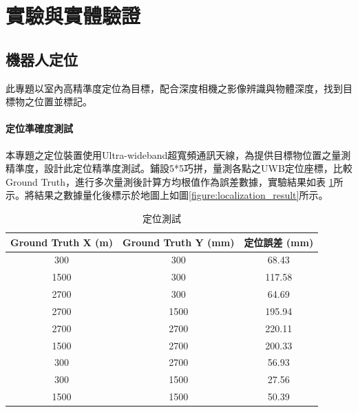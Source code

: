 \section{實驗與實體驗證}

\subsection{機器人定位}

此專題以室內高精準度定位為目標，配合深度相機之影像辨識與物體深度，找到目標物之位置並標記。

\paragraph{定位準確度測試}

本專題之定位裝置使用Ultra-wideband超寬頻通訊天線，為提供目標物位置之量測精準度，設計此定位精準度測試。鋪設5*5巧拼，量測各點之UWB定位座標，比較Ground Truth，進行多次量測後計算方均根值作為誤差數據，實驗結果如表
\ref{table:localization_error}所示。將結果之數據量化後標示於地圖上如圖\ref{figure:localization_result}所示。

\begin{table}[h]
	\centering
	\begin{tabular}{| c| c| c|}
		\hline
		Ground Truth X (m) & Ground Truth Y (mm) & 定位誤差 (mm) \\ 
		\hline
		300 & 300 & 68.43 \\ 
		\hline
		1500  & 300 & 117.58 \\ 
		\hline 
		2700  & 300 & 64.69 \\ 
		\hline 
		2700  & 1500 & 195.94 \\ 
		\hline 
		2700  & 2700 & 220.11 \\ 
		\hline 
		1500  & 2700 & 200.33 \\ 
		\hline 
		300  & 2700 & 56.93 \\ 
		\hline 
		300  & 1500 & 27.56 \\ 
		\hline 
		1500  & 1500 & 50.39 \\ 
		\hline 
	\end{tabular}
	\caption{定位測試}
	\label{table:localization_error}
\end{table} 

